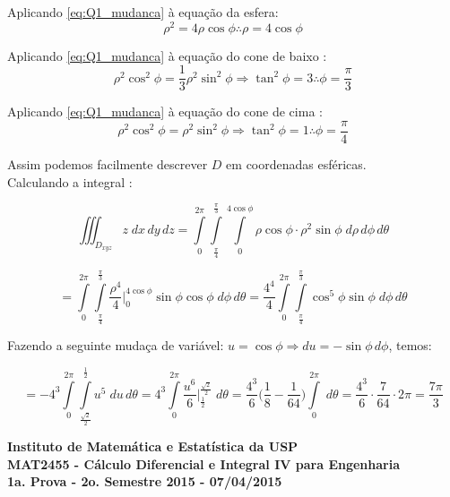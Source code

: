 \documentclass[12pt,a4paper]{article}
\begin{document}
Aplicando \eqref{eq:Q1_mudanca} \`a equaç\~{a}o da esfera:
\begin{equation}
\rho^2 = 4\rho\cos\phi \therefore \rho = 4\cos\phi
\label{eq:Q1_elipsoide}
\end{equation}

Aplicando \eqref{eq:Q1_mudanca} \`a equaç\~{a}o do cone de baixo :
\begin{equation}
\rho^2\cos^2\phi = \frac{1}{3} \rho^ 2 \sin^2\phi \Rightarrow \tan^2 \phi = 3 \therefore \phi = \frac{\pi}{3}
\label{eq:Q1_cone}
\end{equation}

Aplicando \eqref{eq:Q1_mudanca} \`a equaç\~{a}o do cone de cima :
\begin{equation}
\rho^2\cos^2\phi =  \rho^ 2 \sin^2\phi \Rightarrow \tan^2 \phi = 1 \therefore \phi = \frac{\pi}{4}
\label{eq:Q1_cone2}
\end{equation}


Assim podemos facilmente descrever $D$ em coordenadas esf\'{e}ricas. \\

Calculando a integral : \

$$ \iiint_{D_{xyz}}{z}\;dx\,dy\,dz  = \int\limits_{0}^{2\pi} \int\limits_{\frac{\pi}{4}}^{\frac{\pi}{3}}  \int\limits_{0}^{4\cos\phi} \rho \cos \phi \cdot \rho^2 \sin\phi \;d\rho\, d\phi\,d\theta $$

$$ = \int\limits_{0}^{2\pi} \int\limits_{\frac{\pi}{4}}^{\frac{\pi}{3}}  \frac{\rho^4}{4} \Big|_{0}^{4\cos\phi} \sin \phi \cos \phi \;d\phi\,d\theta = \frac{4^4}{4} \int\limits_{0}^{2\pi} \int\limits_{\frac{\pi}{4}}^{\frac{\pi}{3}}  \cos^5\phi \sin \phi \;d\phi\,d\theta  $$

Fazendo a seguinte mudaça de variável: $u = \cos\phi \Rightarrow du = -\sin\phi \, d\phi $, temos:

$$ = -4^3 \int\limits_{0}^{2\pi} \int\limits_{\frac{\sqrt{2}}{2}}^{\frac{1}{2}}  u^5 \;du\,d\theta = 4^3 \int\limits_{0}^{2\pi}  \frac{u^6}{6} \Big|_{\frac{1}{2}}^{\frac{\sqrt{2}}{2}} \;d\theta = \frac{4^3}{6} \Big( \frac{1}{8} - \frac{1}{64} \Big) \int\limits_{0}^{2\pi} \; d\theta= \frac{4^3}{6} \cdot \frac{7}{64} \cdot 2 \pi = \frac{7\pi}{3} $$


\newpage
\begin{center}
\textbf{Instituto de Matemática e Estatística da USP\\
MAT2455 - Cálculo Diferencial e Integral IV para Engenharia\\}
\textbf{1a. Prova - 2o. Semestre 2015 - 07/04/2015}
\end{center}
\end{document}
